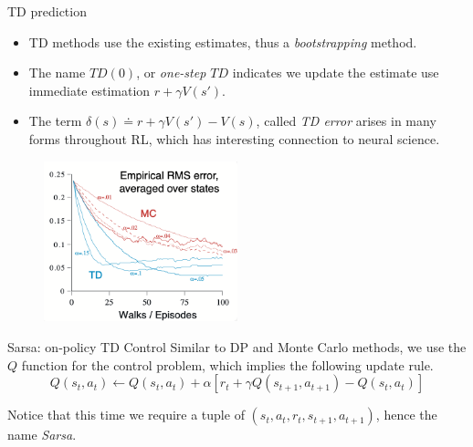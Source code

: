 \documentclass[handout]{beamer}
\begin{document}
\begin{frame}{TD prediction}
\footnotesize
	\begin{itemize}
		\item TD methods use the existing estimates, thus a \textit{bootstrapping} method.
		\item The name $TD(0)$, or \textit{one-step $TD$} indicates we update the estimate use immediate estimation $r + \gamma V(s')$. 
		\item The term $\delta(s) \doteq r + \gamma V(s') - V(s)$, called \textit{TD error} arises in many forms throughout RL, which has interesting connection to neural science.
	\end{itemize}

\begin{figure}[h]
	\centering
	\includegraphics[width=0.5\textwidth]{images/td.png}
\end{figure}	

\end{frame}

\begin{frame}{Sarsa: on-policy TD Control}
\small
Similar to DP and Monte Carlo methods, we use the $Q$ function for the control problem, which implies the following update rule.
\begin{equation*}
	Q(s_t, a_t) \leftarrow Q(s_t, a_t) + \alpha \left[ r_t + \gamma Q(s_{t+1}, a_{t+1}) - Q(s_t, a_t)\right]
\end{equation*}

Notice that this time we require a tuple of $(s_t, a_t, r_t, s_{t+1}, a_{t+1})$, hence the name \textit{Sarsa}.
\end{frame}
\end{document}
